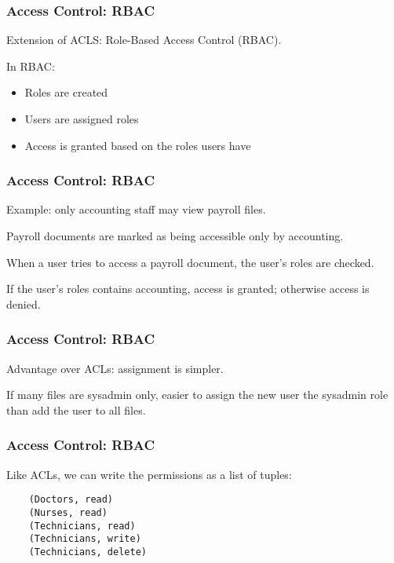 \begin{frame}
\frametitle{Access Control: RBAC}
\begin{changemargin}{1cm}

Extension of ACLS: Role-Based Access Control (RBAC).

In RBAC:

\begin{itemize}
	\item Roles are created
	\item Users are assigned roles
	\item Access is granted based on the roles users have
\end{itemize}

\end{changemargin}
\end{frame}

\begin{frame}
\frametitle{Access Control: RBAC}
\begin{changemargin}{1cm}

Example: only accounting staff may view payroll files.

Payroll documents are marked as being accessible only by accounting. 

When a user tries to access a payroll document, the user's roles are checked. 

If the user's roles contains accounting, access is granted; otherwise access is denied.

\end{changemargin}
\end{frame}

\begin{frame}
\frametitle{Access Control: RBAC}
\begin{changemargin}{1cm}

Advantage over ACLs: assignment is simpler.

If many files are sysadmin only, easier to assign the new user the sysadmin role than add the user to all files.

\end{changemargin}
\end{frame}

\begin{frame}[fragile]
\frametitle{Access Control: RBAC}
\begin{changemargin}{1cm}

Like ACLs, we can write the permissions as a list of tuples:
\begin{verbatim}
	(Doctors, read)
	(Nurses, read)
	(Technicians, read)
	(Technicians, write)
	(Technicians, delete)
\end{verbatim}

\end{changemargin}
\end{frame}

